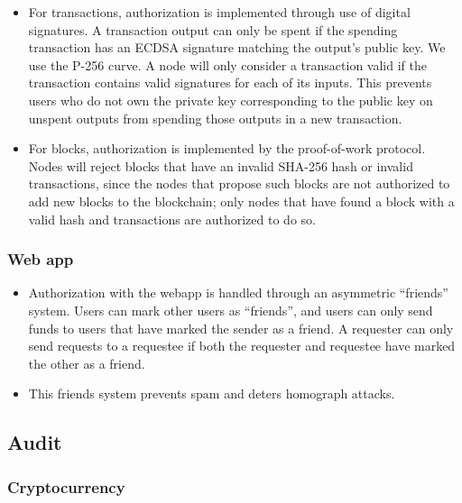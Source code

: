 \documentclass[12pt]{article}
\begin{document}
\begin{itemize}
	\item For transactions, authorization is implemented through use of digital signatures.
	A transaction output can only be spent if the spending transaction has an ECDSA signature matching the output's public key.
	We use the P-256 curve.
	A node will only consider a transaction valid if the transaction contains valid signatures for each of its inputs.
	This prevents users who do not own the private key corresponding to the public key on unspent outputs from spending those outputs in a new transaction.
	\item For blocks, authorization is implemented by the proof-of-work protocol.
	Nodes will reject blocks that have an invalid SHA-256 hash or invalid transactions, since the nodes that propose such blocks are not authorized to add new blocks to the blockchain; only nodes that have found a block with a valid hash and transactions are authorized to do so.
\end{itemize}

\subsubsection*{Web app}

\begin{itemize}
	\item Authorization with the webapp is handled through an asymmetric ``friends'' system.
	Users can mark other users as ``friends'', and users can only send funds to users that have marked the sender as a friend.
  A requester can only send requests to a requestee if both the requester and requestee have marked the other as a friend.
	\item This friends system prevents spam and deters homograph attacks.
\end{itemize}

\subsection{Audit}

\subsubsection*{Cryptocurrency}
\end{document}
